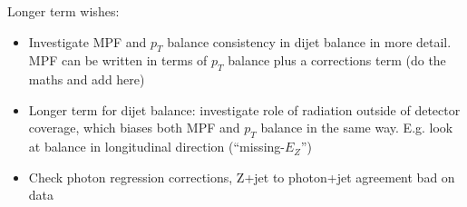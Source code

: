\documentclass[landscape,10pt]{beamer} %
\begin{document}
\newpage

Longer term wishes:
\begin{itemize}
\item Investigate MPF and $p_T$ balance consistency in dijet balance in more detail. MPF can be written in terms of $p_T$ balance plus a corrections term (do the maths and add here)
\item Longer term for dijet balance: investigate role of radiation outside of detector coverage, which biases both MPF and $p_T$ balance in the same way. E.g. look at balance in longitudinal direction (``missing-$E_Z$'')
\item Check photon regression corrections, Z+jet to photon+jet agreement bad on data
\end{itemize}
\end{document}
